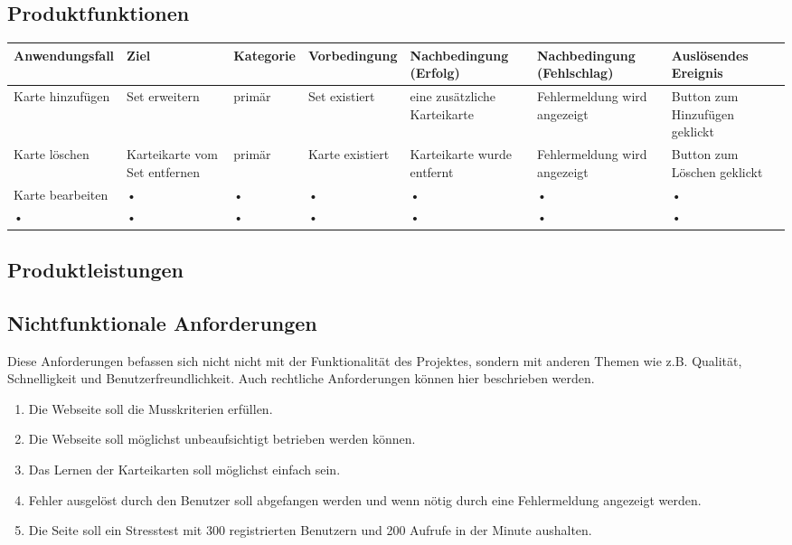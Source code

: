\begin{landscape}
\begin{center}
\subsection{Produktfunktionen}


\begin{tabulary}{1.3\textwidth}{|L|L|L|L|L|L|L|}
\hline 
\textbf{Anwendungsfall} & \textbf{Ziel} & \textbf{Kategorie} & \textbf{Vorbedingung} & \textbf{Nachbedingung (Erfolg)} & \textbf{Nachbedingung (Fehlschlag)} & \textbf{Auslösendes Ereignis} \\ 
\hline 
Karte hinzufügen & Set erweitern & primär & Set existiert & eine zusätzliche Karteikarte & Fehlermeldung wird angezeigt & Button zum Hinzufügen geklickt \\ 
\hline 
Karte löschen & Karteikarte vom Set entfernen & primär & Karte existiert & Karteikarte wurde entfernt & Fehlermeldung wird angezeigt & Button zum Löschen geklickt \\ 
\hline 
Karte bearbeiten & • & • & • & • & • & • \\ 
\hline 
• & • & • & • & • & • & • \\ 
\hline 
\end{tabulary} 
\end{center}
\end{landscape}
\restoregeometry

\subsection{Produktleistungen}

\subsection{Nichtfunktionale Anforderungen}
Diese Anforderungen befassen sich nicht nicht mit der Funktionalität des Projektes, sondern mit anderen Themen wie z.B. Qualität, Schnelligkeit und Benutzerfreundlichkeit. Auch rechtliche Anforderungen können hier beschrieben werden.

\begin{enumerate}[leftmargin=2cm, label=\bfseries /NF\arabic*0/]
	 \item Die Webseite soll die Musskriterien erfüllen.
     \item Die Webseite soll möglichst unbeaufsichtigt betrieben werden können.
     \item Das Lernen der Karteikarten soll möglichst einfach sein.
     \item Fehler ausgelöst durch den Benutzer soll abgefangen werden und wenn nötig durch eine Fehlermeldung angezeigt werden.
     \item Die Seite soll ein Stresstest mit 300 registrierten Benutzern und 200 Aufrufe in der Minute aushalten.
\end{enumerate}

